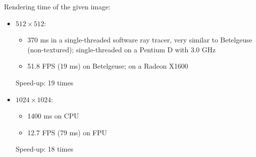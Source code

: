 \documentclass[english,fleqn,10pt,twocolumn]{article}
\begin{document}
\begin{figure}[!ht]
    {\centering {}}
\end{figure}

Rendering time of the given image:
\begin{itemize}
    \item $512 \times 512$:
        \begin{itemize}
            \item 370 ms in a single-threaded software ray tracer, very similar to Betelgeuse (non-textured); single-threaded on a Pentium D with 3.0 GHz
            \item 51.8 FPS (19 ms) on Betelgeuse; on a Radeon X1600
        \end{itemize}
        Speed-up: 19 times
    \item $1024 \times 1024$:
        \begin{itemize}
            \item 1400 ms on CPU
            \item 12.7 FPS (79 ms) on FPU
        \end{itemize}
        Speed-up: 18 times
\end{itemize}


\end{document}

